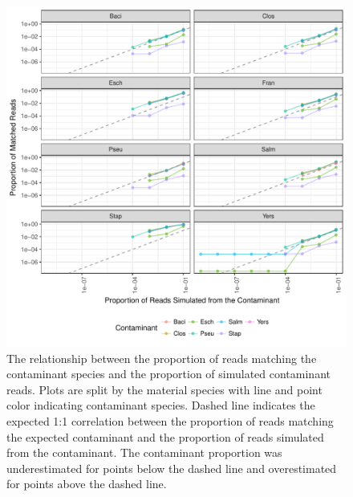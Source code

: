 \documentclass[fleqn,10pt,lineno]{wlpeerj}\usepackage[]{graphicx}\usepackage[]{color}
\makeatletter
\def\maxwidth{ %
  \ifdim\Gin@nat@width>\linewidth
    \linewidth
  \else
    \Gin@nat@width
  \fi
}
\newenvironment{knitrout}{}{} %
\makeatother
\begin{document}
\begin{knitrout}
\color{fgcolor}\begin{figure}
\includegraphics[width=\maxwidth]{figure/contam_fig-1} \caption[The relationship between the proportion of reads matching the contaminant species and the proportion of simulated contaminant reads]{The relationship between the proportion of reads matching the contaminant species and the proportion of simulated contaminant reads. Plots are split by the material species with line and point color indicating contaminant species. Dashed line indicates the expected 1:1 correlation between the proportion of reads matching the expected contaminant and the proportion of reads simulated from the contaminant. The contaminant proportion was underestimated for points below the dashed line and overestimated for points above the dashed line.}\label{fig:contam_fig}
\end{figure}


\end{knitrout}
\end{document}
